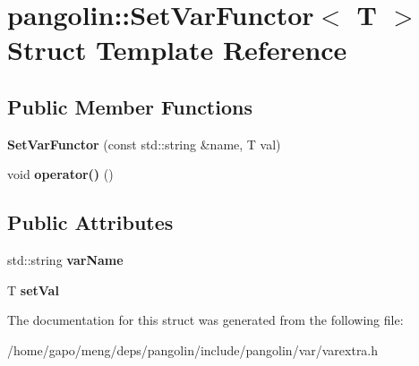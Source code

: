\hypertarget{structpangolin_1_1_set_var_functor}{}\section{pangolin\+:\+:Set\+Var\+Functor$<$ T $>$ Struct Template Reference}
\label{structpangolin_1_1_set_var_functor}
\subsection*{Public Member Functions}
\begin{DoxyCompactItemize}
\item 
{\bfseries Set\+Var\+Functor} (const std\+::string \&name, T val)\hypertarget{structpangolin_1_1_set_var_functor_a784b09d37ebc818ed1168deec5371eef}{}\label{structpangolin_1_1_set_var_functor_a784b09d37ebc818ed1168deec5371eef}

\item 
void {\bfseries operator()} ()\hypertarget{structpangolin_1_1_set_var_functor_a7f24b53dbb8f9a2ba159b4ea914c78a5}{}\label{structpangolin_1_1_set_var_functor_a7f24b53dbb8f9a2ba159b4ea914c78a5}

\end{DoxyCompactItemize}
\subsection*{Public Attributes}
\begin{DoxyCompactItemize}
\item 
std\+::string {\bfseries var\+Name}\hypertarget{structpangolin_1_1_set_var_functor_a47e6732ba66d6c761f26262253c0f421}{}\label{structpangolin_1_1_set_var_functor_a47e6732ba66d6c761f26262253c0f421}

\item 
T {\bfseries set\+Val}\hypertarget{structpangolin_1_1_set_var_functor_acf385bff6fc6b60d208c24a7ba58678f}{}\label{structpangolin_1_1_set_var_functor_acf385bff6fc6b60d208c24a7ba58678f}

\end{DoxyCompactItemize}


The documentation for this struct was generated from the following file\+:\begin{DoxyCompactItemize}
\item 
/home/gapo/meng/deps/pangolin/include/pangolin/var/varextra.\+h\end{DoxyCompactItemize}
